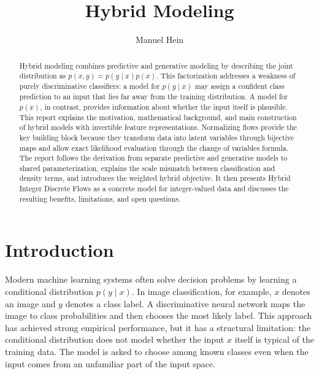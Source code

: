 \documentclass[runningheads]{llncs}
\begin{document}
\title{Hybrid Modeling}

\author{Manuel Hein}


\maketitle

\begin{abstract}
Hybrid modeling combines predictive and generative modeling by describing the
joint distribution as \(p(x,y)=p(y\mid x)p(x)\). This factorization addresses a
weakness of purely discriminative classifiers: a model for \(p(y\mid x)\) may
assign a confident class prediction to an input that lies far away from the
training distribution. A model for \(p(x)\), in contrast, provides information
about whether the input itself is plausible. This report explains the motivation,
mathematical background, and main construction of hybrid models with invertible
feature representations. Normalizing flows provide the key building block because
they transform data into latent variables through bijective maps and allow exact
likelihood evaluation through the change of variables formula. The report follows
the derivation from separate predictive and generative models to shared
parameterization, explains the scale mismatch between classification and density
terms, and introduces the weighted hybrid objective. It then presents Hybrid
Integer Discrete Flows as a concrete model for integer-valued data and discusses
the resulting benefits, limitations, and open questions.

\end{abstract}

\section{Introduction}

Modern machine learning systems often solve decision problems by learning a
conditional distribution \(p(y\mid x)\). In image classification, for example,
\(x\) denotes an image and \(y\) denotes a class label. A discriminative neural
network maps the image to class probabilities and then chooses the most likely
label. This approach has achieved strong empirical performance, but it has a
structural limitation: the conditional distribution does not model whether the
input \(x\) itself is typical of the training data. The model is asked to choose
among known classes even when the input comes from an unfamiliar part of the
input space.
\end{document}
